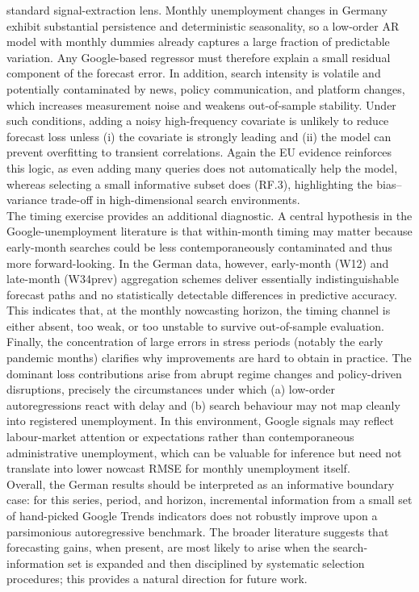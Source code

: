 \documentclass[12pt,a4paper]{article}
\begin{document}
standard signal-extraction lens. Monthly unemployment changes in Germany exhibit
substantial persistence and deterministic seasonality, so a low-order AR model with
monthly dummies already captures a large fraction of predictable variation. Any
Google-based regressor must therefore explain a small residual component of the
forecast error. In addition, search intensity is volatile and potentially contaminated
by news, policy communication, and platform changes, which increases measurement
noise and weakens out-of-sample stability. Under such conditions, adding a noisy
high-frequency covariate is unlikely to reduce forecast loss unless (i) the covariate is
strongly leading and (ii) the model can prevent overfitting to transient correlations.
Again the EU evidence reinforces this logic, as even adding many queries does not
automatically help the model, whereas selecting a small informative subset does (RF.3),
highlighting the bias--variance trade-off in high-dimensional search environments.\\
The timing exercise provides an additional diagnostic. A central hypothesis in the
Google-unemployment literature is that within-month timing may matter because
early-month searches could be less contemporaneously contaminated and thus more
forward-looking. In the German data, however, early-month (W12) and late-month
(W34prev) aggregation schemes deliver essentially indistinguishable forecast paths and
no statistically detectable differences in predictive accuracy. This indicates that, at
the monthly nowcasting horizon, the timing channel is either absent, too weak, or too
unstable to survive out-of-sample evaluation.\\
Finally, the concentration of large errors in stress periods (notably the early pandemic
months) clarifies why improvements are hard to obtain in practice. The dominant
loss contributions arise from abrupt regime changes and policy-driven disruptions,
precisely the circumstances under which (a) low-order autoregressions react with
delay and (b) search behaviour may not map cleanly into registered unemployment.
In this environment, Google signals may reflect labour-market attention or
expectations rather than contemporaneous administrative unemployment,
which can be valuable for inference  but need not
translate into lower nowcast RMSE for monthly unemployment itself.
\\
Overall, the German results should be interpreted as an informative boundary case:
for this series, period, and horizon, incremental information from a small set of
hand-picked Google Trends indicators does not robustly improve upon a parsimonious autoregressive
benchmark. The broader literature suggests that forecasting gains, when present, are
most likely to arise when the search-information set is expanded and then disciplined
by systematic selection procedures; this provides a natural direction for future work.
\end{document}
